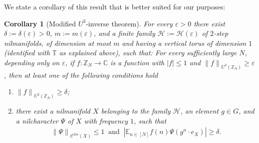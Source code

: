 \documentclass[11pt]{amsart}
\newtheorem{corollary}[lemma]{Corollary}
\theoremstyle{definition}
\begin{document}
 We state a
corollary of this result that is better suited for our purposes:
\begin{corollary}[Modified $U^3$-inverse theorem]
\label{cor:inverse}
For every ${\varepsilon}>0$ there exist
$\delta:=\delta({\varepsilon})>0$, $m:=m({\varepsilon})$,
and a finite family ${{\mathcal H}}:={{\mathcal H}}({\varepsilon})$ of
 $2$-step nilmanifolds,
of dimension at most $m$  and having a vertical torus of dimension $1$
(identified with ${{\mathbb T}}$ as explained above),
such that:
 For
every   sufficiently large $N$, depending only on ${\varepsilon}$, if
$f\colon{{\mathbb Z}}_N \to{{\mathbb C}}$ is a function with $|f|\leq 1$ and ${\lVert f \rVert}_{U^3({{\mathbb Z}}_N)}\geq{\varepsilon}$, then at least one of the following conditions
hold
\begin{enumerate}
\item
\label{it:inverse1}
 ${\lVert f \rVert}_{U^2({{\mathbb Z}}_N)}\geq\delta$;
\item
\label{it:inverse2} there exist a nilmanifold  $X$ belonging to the
family ${{\mathcal H}}$, an element $g\in G$, and a nilcharacter $\Psi$ of $X$
with frequency $1$,
such that
\begin{gather*}
{\lVert \Psi \rVert}_{{{\mathcal C}}^{2m}(X)}\leq 1 \ \text{ and } \
|{{\mathbb E}}_{n\in[N]}f(n)\Psi(g^n\cdot e_{X})|\geq\delta.
\end{gather*}
\end{enumerate}
\end{corollary}
\end{document}
